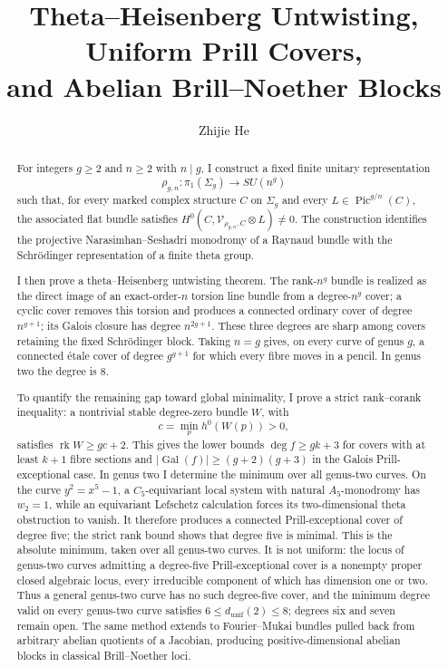 \documentclass[11pt,reqno]{amsart}
\title[Theta--Heisenberg Untwisting]{Theta--Heisenberg Untwisting, Uniform Prill Covers,\\
and Abelian Brill--Noether Blocks}
\author{Zhijie He}
\date{}
\numberwithin{equation}{section}
\theoremstyle{remark}
\DeclareMathOperator{\Pic}{Pic}
\DeclareMathOperator{\rk}{rk}
\DeclareMathOperator{\Gal}{Gal}
\newcommand{\cV}{\mathcal V}
\begin{document}
\begin{abstract}
For integers \(g\geq2\) and \(n\geq2\) with \(n\mid g\), I construct a
fixed finite unitary representation
\[
 \rho_{g,n}\colon\pi_1(\Sigma_g)\longrightarrow SU(n^g)
\]
such that, for every marked complex structure \(C\) on \(\Sigma_g\) and
every \(L\in\Pic^{g/n}(C)\), the associated flat bundle satisfies
\(H^0(C,\cV_{\rho_{g,n},C}\otimes L)\neq0\).  The construction identifies
the projective Narasimhan--Seshadri monodromy of a Raynaud bundle with the
Schr\"odinger representation of a finite theta group.

I then prove a theta--Heisenberg untwisting theorem.  The rank-\(n^g\)
bundle is realized as the direct image of an exact-order-\(n\) torsion
line bundle from a degree-\(n^g\) cover; a cyclic cover removes this
torsion and produces a
connected ordinary cover of degree \(n^{g+1}\); its Galois closure has
degree \(n^{2g+1}\).  These three degrees are sharp among covers retaining
the fixed Schr\"odinger block.  Taking \(n=g\) gives, on every curve of
genus \(g\), a connected \'etale cover of degree \(g^{g+1}\) for which
every fibre moves in a pencil.  In genus two the degree is \(8\).

To quantify the remaining gap toward global minimality, I prove a
strict rank--corank inequality: a nontrivial
stable degree-zero bundle \(W\), with
\[
 c=\min_p h^0(W(p))>0,
\]
satisfies \(\rk W\geq gc+2\).  This gives the lower bounds
\(\deg f\geq gk+3\) for covers with at least \(k+1\) fibre sections and
\(|\Gal(f)|\geq(g+2)(g+3)\) in the Galois Prill-exceptional case.
In genus two I determine the minimum over all genus-two curves.  On the curve
\(y^2=x^5-1\), a \(C_5\)-equivariant local system with natural
\(A_5\)-monodromy has \(w_2=1\), while an equivariant Lefschetz
calculation forces its two-dimensional theta obstruction to vanish.
It therefore produces a connected Prill-exceptional cover of degree
five; the strict rank bound shows that degree five is minimal.
This is the absolute minimum, taken over all genus-two curves.  It is
not uniform: the locus of genus-two curves admitting a degree-five
Prill-exceptional cover is a nonempty proper closed algebraic locus,
every irreducible component of which has dimension one or two.  Thus a
general genus-two curve has no such degree-five cover, and the minimum
degree valid on every genus-two curve satisfies
\(6\leq d_{\mathrm{unif}}(2)\leq8\); degrees six and seven remain open.
The same method extends to Fourier--Mukai bundles pulled back from
arbitrary abelian quotients of a Jacobian, producing
positive-dimensional abelian blocks in classical Brill--Noether loci.
\end{abstract}
\end{document}
